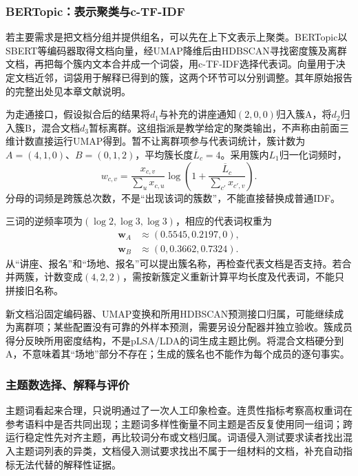 \subsubsection{BERTopic：表示聚类与c-TF-IDF}
\label{sec:nlp-classification-bertopic}

若主要需求是把文档分组并提供组名，可以先在上下文表示上聚类。BERTopic以SBERT等编码器取得文档向量，经UMAP降维后由HDBSCAN寻找密度簇及离群文档，再把每个簇内文本合并成一个词袋，用c-TF-IDF选择代表词。向量用于决定文档近邻，词袋用于解释已得到的簇，这两个环节可以分别调整。其\citeyear{nlp-grootendorst2022bertopic}年原始报告的完整出处见本章文献说明。

为走通接口，假设拟合后的结果将$d_1$与补充的讲座通知$(2,0,0)$归入簇A，将$d_2$归入簇B，混合文档$d_3$暂标离群。这组指派是教学给定的聚类输出，不声称由前面三维计数直接运行UMAP得到。暂不让离群项参与代表词统计，簇计数为$A=(4,1,0)$、$B=(0,1,2)$，平均簇长度$\overline L_c=4$。采用簇内$L_1$归一化词频时，
\[
 w_{c,v}=\frac{x_{c,v}}{\sum_u x_{c,u}}
       \log\!\left(1+\frac{\overline L_c}{\sum_{c'}x_{c',v}}\right).
\]
分母的词频是跨簇总次数，不是“出现该词的簇数”，不能直接替换成普通IDF。

三词的逆频率项为$(\log2,\log3,\log3)$，相应的代表词权重为
\[
  \begin{aligned}
    \bm w_A&\approx(0.5545,0.2197,0),\\
    \bm w_B&\approx(0,0.3662,0.7324).
  \end{aligned}
\]
从“讲座、报名”和“场地、报名”可以提出簇名称，再检查代表文档是否支持。若合并两簇，计数变成$(4,2,2)$，需按新簇定义重新计算平均长度及代表词，不能只拼接旧名称。

新文档沿固定编码器、UMAP变换和所用HDBSCAN预测接口归属，可能继续成为离群项；某些配置没有可靠的外样本预测，需要另设分配器并独立验收。簇成员得分反映所用密度结构，不是pLSA/LDA的词生成主题比例。将混合文档硬分到A，不意味着其“场地”部分不存在；生成的簇名也不能作为每个成员的逐句事实。

\subsubsection{主题数选择、解释与评价}
\label{sec:nlp-classification-topic-evaluation}

主题词看起来合理，只说明通过了一次人工印象检查。连贯性指标考察高权重词在参考语料中是否共同出现；主题词多样性衡量不同主题是否反复使用同一组词；跨运行稳定性先对齐主题，再比较词分布或文档归属。词语侵入测试要求读者找出混入主题词列表的异类，文档侵入测试要求找出不属于一组材料的文档，补充自动指标无法代替的解释性证据。

